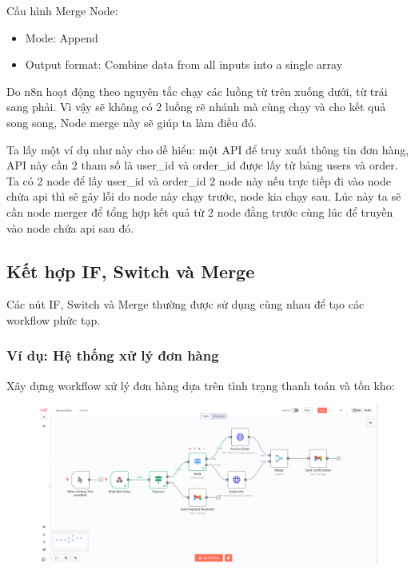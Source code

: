 Cấu hình Merge Node:
\begin{itemize}
  \item Mode: Append
  \item Output format: Combine data from all inputs into a single array
\end{itemize}

Do n8n hoạt động theo nguyên tắc chạy các luồng từ trên xuống dưới, từ trái sang phải. Vì vậy sẽ không có 2 luồng rẽ nhánh mà cùng chạy và cho kết quả song song, Node merge này sẽ giúp ta làm điều đó. 


Ta lấy một ví dụ như này cho dễ hiểu: một API để truy xuất thông tin đơn hàng, API này cần 2 tham số là user\_id và order\_id được lấy từ bảng users và order. Ta có 2 node để lấy user\_id và order\_id 2 node này nếu trực tiếp đi vào node chứa api thì sẽ gây lỗi do node này chạy trước, node kia chạy sau. Lúc này ta sẽ cần node merger để tổng hợp kết quả từ 2 node đằng trước cùng lúc để truyền vào node chứa api sau đó.

\clearpage
\subsection{Kết hợp IF, Switch và Merge}

Các nút IF, Switch và Merge thường được sử dụng cùng nhau để tạo các workflow phức tạp.

\subsubsection{Ví dụ: Hệ thống xử lý đơn hàng}

Xây dựng workflow xử lý đơn hàng dựa trên tình trạng thanh toán và tồn kho:

\begin{figure}[htbp]
    \centering
    \includegraphics[width=1\linewidth]{Chap1-7/stock.pdf}
\end{figure}

